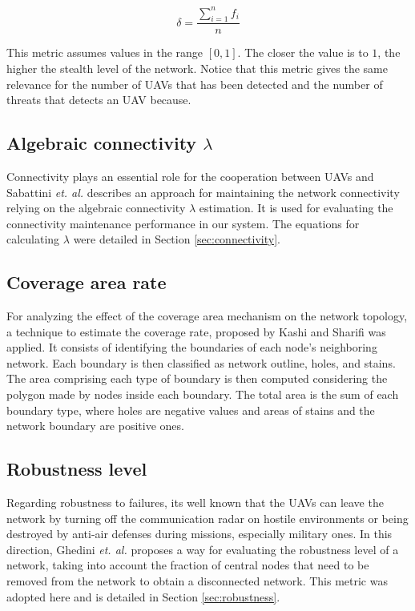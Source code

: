 \begin{equation}
    \delta = \frac{\sum_{i=1}^{n} f_i}{n}
\end{equation}

This metric assumes values in the range $[0,1]$. The closer the value is to $1$, the higher the stealth level of the network. Notice that this metric gives the same relevance for the number of UAVs that has been detected and the number of threats that detects an UAV because.

\subsection{Algebraic connectivity $\lambda$}

Connectivity plays an essential role for the cooperation between UAVs and Sabattini \textit{et. al.} \cite{sabattiniijrr2013} describes an approach for maintaining the network connectivity relying on the algebraic connectivity $\lambda$ estimation. It is used for evaluating the connectivity maintenance performance in our system. The equations for calculating $\lambda$ were detailed in Section \ref{sec:connectivity}. 

\subsection{Coverage area rate}

For analyzing the effect of the coverage area mechanism on the network topology, a technique to estimate the coverage rate, proposed by Kashi and Sharifi \cite{kashi_2012} was applied. It consists of identifying the boundaries of each node's neighboring network. Each boundary is then classified as network outline, holes, and stains. The area comprising each type of boundary is then computed considering the polygon made by nodes inside each boundary. The total area is the sum of each boundary type, where holes are negative values and areas of stains and the network boundary are positive ones.

\subsection{Robustness level}

Regarding robustness to failures, its well known that the UAVs can leave the network by turning off the communication radar on hostile environments or being destroyed by anti-air defenses during missions, especially military ones. In this direction,  Ghedini \textit{et. al.} \cite{ghedini_2016} proposes a way for evaluating the robustness level of a network, taking into account the fraction of central nodes that need to be removed from the network to obtain a disconnected network. This metric was adopted here and is detailed in Section \ref{sec:robustness}.

